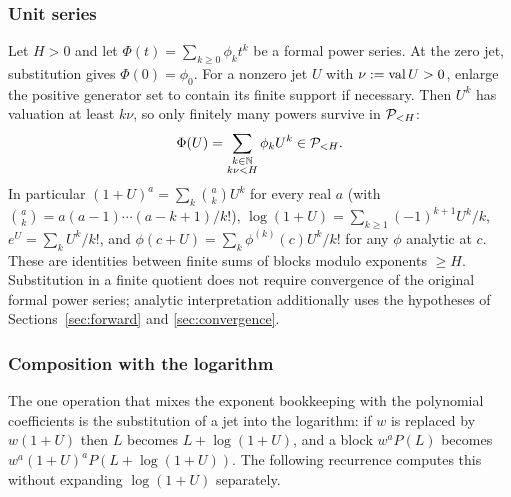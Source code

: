 \subsubsection*{Unit series}

Let $H>0$ and let $\Phi(t)=\sum_{k\ge0}\phi_kt^k$ be a formal power
series. At the zero jet, substitution gives $\Phi(0)=\phi_0$. For a
nonzero jet $U$ with $\nu:=\operatorname{val} U>0$, enlarge the positive generator
set to contain its finite support if necessary. Then $U^k$ has valuation
at least $k\nu$, so only finitely many powers survive in $\mathcal P_{<H}$:
\begin{equation}
 \Phi(U)=\sum_{\substack{k\in\mathbb N\\k\nu<H}}\phi_kU^k\in\mathcal P_{<H}.
 \label{eq:unit-series}
\end{equation}
In particular $(1+U)^a=\sum_k\binom akU^k$ for every real $a$ (with $\binom ak=a(a-1)\cdots(a-k+1)/k!$), $\log(1+U)=\sum_{k\ge1}(-1)^{k+1}U^k/k$, $e^U=\sum_kU^k/k!$, and $\phi(c+U)=\sum_k\phi^{(k)}(c)U^k/k!$ for any $\phi$ analytic at $c$. These are identities between finite sums of blocks modulo exponents $\ge H$. Substitution in a finite quotient does not require convergence of the original formal power series; analytic interpretation additionally uses the hypotheses of Sections~\ref{sec:forward} and \ref{sec:convergence}.

\subsubsection*{Composition with the logarithm}

The one operation that mixes the exponent bookkeeping with the polynomial coefficients is the substitution of a jet into the logarithm: if $w$ is replaced by $w(1+U)$ then $L$ becomes $L+\log(1+U)$, and a block $w^a P(L)$ becomes $w^a(1+U)^aP(L+\log(1+U))$. The following recurrence computes this without expanding $\log(1+U)$ separately.


